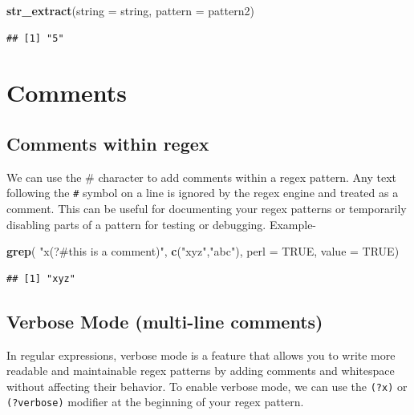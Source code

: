 \documentclass[
]{book}
\newenvironment{Shaded}{\begin{snugshade}}{\end{snugshade}}
\newcommand{\AttributeTok}[1]{\textcolor[rgb]{0.13,0.29,0.53}{#1}}
\newcommand{\ConstantTok}[1]{\textcolor[rgb]{0.56,0.35,0.01}{#1}}
\newcommand{\FunctionTok}[1]{\textcolor[rgb]{0.13,0.29,0.53}{\textbf{#1}}}
\newcommand{\NormalTok}[1]{#1}
\newcommand{\StringTok}[1]{\textcolor[rgb]{0.31,0.60,0.02}{#1}}
\begin{document}
\begin{Shaded}
\begin{Highlighting}[]
\FunctionTok{str\_extract}\NormalTok{(}\AttributeTok{string =}\NormalTok{ string, }\AttributeTok{pattern =}\NormalTok{ pattern2)}
\end{Highlighting}
\end{Shaded}

\begin{verbatim}
## [1] "5"
\end{verbatim}

\hypertarget{comments}{%
\section{Comments}\label{comments}}

\hypertarget{comments-within-regex}{%
\subsection{Comments within regex}\label{comments-within-regex}}

We can use the \# character to add comments within a regex pattern. Any text following the \texttt{\#} symbol on a line is ignored by the regex engine and treated as a comment. This can be useful for documenting your regex patterns or temporarily disabling parts of a pattern for testing or debugging. Example-

\begin{Shaded}
\begin{Highlighting}[]
\FunctionTok{grep}\NormalTok{( }\StringTok{"x(?\#this is a comment)"}\NormalTok{, }\FunctionTok{c}\NormalTok{(}\StringTok{"xyz"}\NormalTok{,}\StringTok{"abc"}\NormalTok{), }\AttributeTok{perl =} \ConstantTok{TRUE}\NormalTok{, }\AttributeTok{value =} \ConstantTok{TRUE}\NormalTok{)}
\end{Highlighting}
\end{Shaded}

\begin{verbatim}
## [1] "xyz"
\end{verbatim}

\hypertarget{verbose-mode-multi-line-comments}{%
\subsection{Verbose Mode (multi-line comments)}\label{verbose-mode-multi-line-comments}}

In regular expressions, verbose mode is a feature that allows you to write more readable and maintainable regex patterns by adding comments and whitespace without affecting their behavior. To enable verbose mode, we can use the \texttt{(?x)} or \texttt{(?verbose)} modifier at the beginning of your regex pattern.
\end{document}

